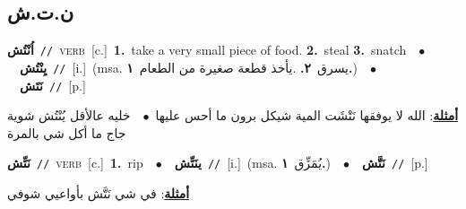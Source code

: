 \documentclass[10pt,a4paper,twoside]{article} %
\begin{document}
\begin{multicols}{2}
{{{{{{{{{{\vspace{-3mm}
\subsection*{\color{blue}\foreignlanguage{arabic}{ن.ت.ش}\color{blue}{}} 

{\setlength\topsep{0pt}\textbf{\foreignlanguage{arabic}{اُنْتُش}}\ {\color{gray}\texttt{//}\color{black}}\ \textsc{verb}\ [c.]\ \textbf{1.}~take a very small piece of food.  \textbf{2.}~steal  \textbf{3.}~snatch\ \ $\bullet$\ \ \setlength\topsep{0pt}\textbf{\foreignlanguage{arabic}{يِنْتُش}}\ {\color{gray}\texttt{//}\color{black}}\ [i.]\ \color{gray}(msa. \foreignlanguage{arabic}{يسرق}~\foreignlanguage{arabic}{\textbf{٢.}}  .\foreignlanguage{arabic}{يأخذ قطعة صغيرة من الطعام}~\foreignlanguage{arabic}{\textbf{١.}})\color{black}\ \ $\bullet$\ \ \setlength\topsep{0pt}\textbf{\foreignlanguage{arabic}{نَتَش}}\ {\color{gray}\texttt{//}\color{black}}\ [p.]\  \begin{flushright}\color{gray}\foreignlanguage{arabic}{\textbf{\underline{\foreignlanguage{arabic}{أمثلة}}}: الله لا يوفقها نَتْشَت المية شيكل برون ما أحس عليها\ $\bullet$\ \  خليه عالأقل يُنْتُش شوية جاج ما أكل شي بالمرة}\end{flushright}\color{black}} \vspace{2mm}

{\setlength\topsep{0pt}\textbf{\foreignlanguage{arabic}{نَتِّش}}\ {\color{gray}\texttt{//}\color{black}}\ \textsc{verb}\ [c.]\ \textbf{1.}~rip\ \ $\bullet$\ \ \setlength\topsep{0pt}\textbf{\foreignlanguage{arabic}{ينَتِّش}}\ {\color{gray}\texttt{//}\color{black}}\ [i.]\ \color{gray}(msa. \foreignlanguage{arabic}{يُمَزِّق}~\foreignlanguage{arabic}{\textbf{١.}})\color{black}\ \ $\bullet$\ \ \setlength\topsep{0pt}\textbf{\foreignlanguage{arabic}{نَتَّش}}\ {\color{gray}\texttt{//}\color{black}}\ [p.]\  \begin{flushright}\color{gray}\foreignlanguage{arabic}{\textbf{\underline{\foreignlanguage{arabic}{أمثلة}}}: في شي نَتَّش بأواعيي شوفي}\end{flushright}\color{black}} \vspace{2mm}

}}}}}}}}}}
\end{multicols}
\end{document}
